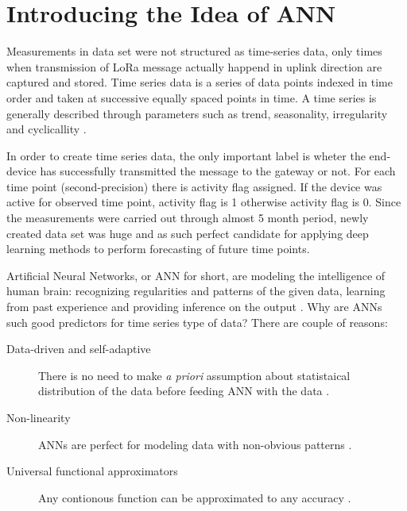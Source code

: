 \documentclass[11pt, a4paper]{article} %
\begin{document}
\section{Introducing the Idea of ANN}

Measurements in data set were not structured as time-series data, only times when transmission of LoRa message actually happend in uplink direction are captured and stored. 
Time series data is a series of data points indexed in time order and taken at successive equally spaced points in time. A time series is generally described through parameters such as trend, seasonality, irregularity and cyclicallity \cite{Adhikari_timeseries}.

In order to create time series data, the only important label is wheter the end-device has successfully transmitted the message to the gateway or not. 
For each time point (second-precision) there is activity flag assigned. If the device was active for observed time point, activity flag is 1 otherwise activity flag is 0.
Since the measurements were carried out through almost 5 month period, newly created data set was huge and as such perfect candidate for applying deep learning methods to perform forecasting of future time points.

Artificial Neural Networks, or ANN for short, are modeling the intelligence of human brain: recognizing regularities and patterns of the given data, learning from past experience and providing inference on the output \cite{Adhikari_timeseries}.
Why are ANNs such good predictors for time series type of data? There are couple of reasons:
\begin{description}
	\item[Data-driven and self-adaptive] There is no need to make \emph{a priori} assumption about statistaical distribution of the data before feeding ANN with the data \cite{Adhikari_timeseries}.
	\item [Non-linearity] ANNs are perfect for modeling data with non-obvious patterns \cite{Zhang_ann}.
	\item [Universal functional approximators] Any contionous function can be approximated to any accuracy \cite{Hornik_ann}.
\end{description}
\end{document}
